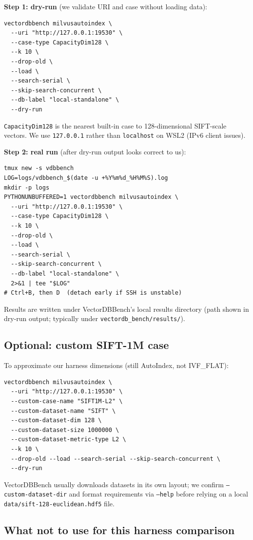 \documentclass[11pt,a4paper]{article}
\begin{document}
\textbf{Step 1: dry-run} (we validate URI and case without loading data):
\begin{verbatim}
vectordbbench milvusautoindex \
  --uri "http://127.0.0.1:19530" \
  --case-type CapacityDim128 \
  --k 10 \
  --drop-old \
  --load \
  --search-serial \
  --skip-search-concurrent \
  --db-label "local-standalone" \
  --dry-run
\end{verbatim}

\texttt{CapacityDim128} is the nearest built-in case to 128-dimensional SIFT-scale vectors.
We use \texttt{127.0.0.1} rather than \texttt{localhost} on WSL2 (IPv6 client issues).

\textbf{Step 2: real run} (after dry-run output looks correct to us):
\begin{verbatim}
tmux new -s vdbbench
LOG=logs/vdbbench_$(date -u +%Y%m%d_%H%M%S).log
mkdir -p logs
PYTHONUNBUFFERED=1 vectordbbench milvusautoindex \
  --uri "http://127.0.0.1:19530" \
  --case-type CapacityDim128 \
  --k 10 \
  --drop-old \
  --load \
  --search-serial \
  --skip-search-concurrent \
  --db-label "local-standalone" \
  2>&1 | tee "$LOG"
# Ctrl+B, then D  (detach early if SSH is unstable)
\end{verbatim}

Results are written under VectorDBBench's local results directory (path shown in dry-run
output; typically under \texttt{vectordb\_bench/results/}).

\subsection{Optional: custom SIFT-1M case}

To approximate our harness dimensions (still AutoIndex, not IVF\_FLAT):
\begin{verbatim}
vectordbbench milvusautoindex \
  --uri "http://127.0.0.1:19530" \
  --custom-case-name "SIFT1M-L2" \
  --custom-dataset-name "SIFT" \
  --custom-dataset-dim 128 \
  --custom-dataset-size 1000000 \
  --custom-dataset-metric-type L2 \
  --k 10 \
  --drop-old --load --search-serial --skip-search-concurrent \
  --dry-run
\end{verbatim}

VectorDBBench usually downloads datasets in its own layout; we confirm
\texttt{--custom-dataset-dir} and format requirements via \texttt{--help} before relying
on a local \texttt{data/sift-128-euclidean.hdf5} file.

\subsection{What not to use for this harness comparison}
\end{document}

